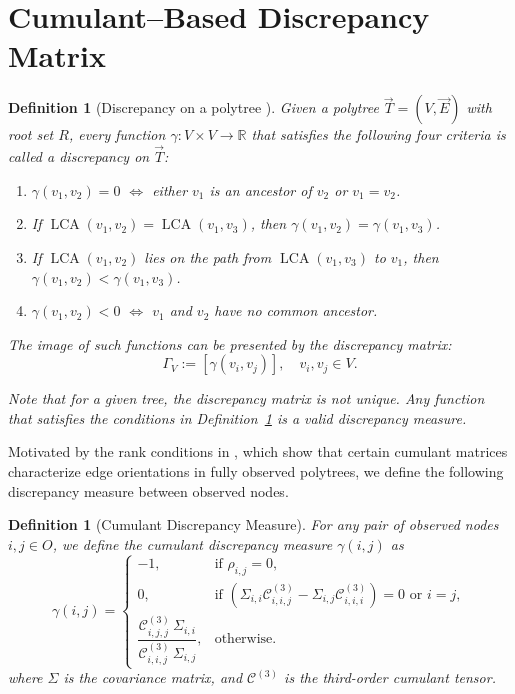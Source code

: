 \documentclass[11pt,a4paper]{article}
\numberwithin{equation}{section}
\newtheorem{definition}[theorem]{Definition}
\begin{document}
\section{Cumulant--Based Discrepancy Matrix}
\label{sec:discrepancy}
\begin{definition}[Discrepancy on a polytree {\citealp[Def.~7]{etesami:kiyavash:coleman:2016}}]
\label{def:discrepancy_paper1}
Given a polytree $\vec T=(V,\vec E)$ with root set $R$, every function 
$\gamma:V\times V\to\mathbb R$ that satisfies the following four criteria 
is called a \emph{discrepancy} on $\vec T$:
\begin{enumerate}[label=(\arabic*)]
  \item $\gamma(v_1,v_2)=0$ $\iff$ either $v_1$ is an ancestor of $v_2$ or $v_1=v_2$.
  \item If $\operatorname{LCA}(v_1,v_2)=\operatorname{LCA}(v_1,v_3)$, then $\gamma(v_1,v_2)=\gamma(v_1,v_3)$.
  \item If $\operatorname{LCA}(v_1,v_2)$ lies on the path from $\operatorname{LCA}(v_1,v_3)$ to $v_1$, then $\gamma(v_1,v_2) < \gamma(v_1,v_3)$.
  \item $\gamma(v_1,v_2)<0$ $\iff$ $v_1$ and $v_2$ have no common ancestor.
\end{enumerate}

The image of such functions can be presented by the discrepancy matrix:
\[
  \Gamma_V := \left[ \gamma(v_i, v_j) \right], \quad v_i, v_j \in V.
\]

Note that for a given tree, the discrepancy matrix is not unique. Any function that satisfies the conditions in Definition~\ref{def:discrepancy_paper1} is a valid discrepancy measure.

\end{definition}
Motivated by the rank conditions in \citet[Prop.~2.10]{tramontano:monod:drton:2022}, which show that certain cumulant matrices characterize edge orientations in fully observed polytrees, we define the following discrepancy measure between observed nodes.

\begin{definition}[Cumulant Discrepancy Measure]
\label{def:discrepancy}
 For any pair of observed nodes $i, j \in O$, we define the cumulant discrepancy measure $\gamma(i,j)$ as
\begin{equation}\label{eq:gamma}
\gamma(i,j) =
\begin{cases}
-1, & \text{if } \rho_{i,j} = 0, \\[0.5ex]
0, & \text{if } (\Sigma_{i,i} \mathcal{C}^{(3)}_{i,i,j} - \Sigma_{i,j} \mathcal{C}^{(3)}_{i,i,i}) = 0 \text{ or } i = j, \\[0.5ex]
\dfrac{\mathcal{C}^{(3)}_{i,j,j} \, \Sigma_{i,i}}{\mathcal{C}^{(3)}_{i,i,j} \, \Sigma_{i,j}}, & \text{otherwise}.
\end{cases}
\end{equation}
\noindent
where $\Sigma$ is the covariance matrix, and $\mathcal{C}^{(3)}$ is the third-order cumulant tensor.

\end{definition}
\end{document}

